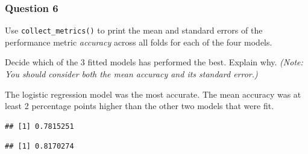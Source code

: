 \documentclass[
]{article}
\newenvironment{Shaded}{\begin{snugshade}}{\end{snugshade}}
\newcommand{\CommentTok}[1]{\textcolor[rgb]{0.56,0.35,0.01}{\textit{#1}}}
\newcommand{\DecValTok}[1]{\textcolor[rgb]{0.00,0.00,0.81}{#1}}
\newcommand{\FunctionTok}[1]{\textcolor[rgb]{0.00,0.00,0.00}{#1}}
\newcommand{\NormalTok}[1]{#1}
\newcommand{\OtherTok}[1]{\textcolor[rgb]{0.56,0.35,0.01}{#1}}
\newcommand{\SpecialCharTok}[1]{\textcolor[rgb]{0.00,0.00,0.00}{#1}}
\begin{document}
\hypertarget{question-6}{%
\subsubsection{Question 6}\label{question-6}}

Use \texttt{collect\_metrics()} to print the mean and standard errors of
the performance metric \emph{accuracy} across all folds for each of the
four models.

Decide which of the 3 fitted models has performed the best. Explain why.
\emph{(Note: You should consider both the mean accuracy and its standard
error.)}

The logistic regression model was the most accurate. The mean accuracy
was at least 2 percentage points higher than the other two models that
were fit.

\begin{Shaded}
\end{Shaded}

\begin{verbatim}
## [1] 0.7815251
\end{verbatim}

\begin{Shaded}
\end{Shaded}

\begin{verbatim}
## [1] 0.8170274
\end{verbatim}

\begin{Shaded}
\end{Shaded}
\end{document}
